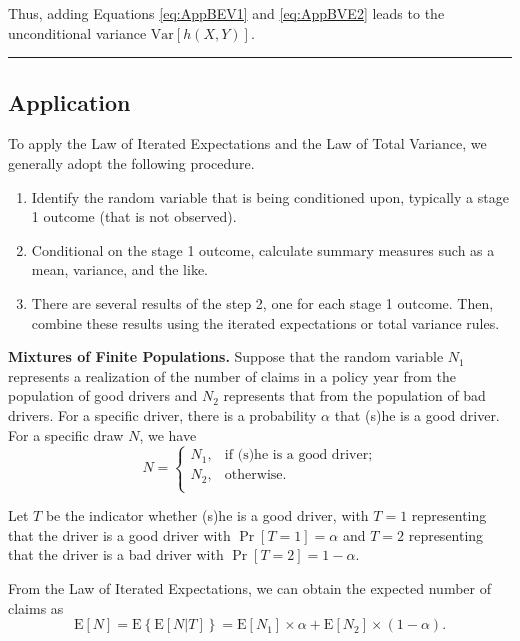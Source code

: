 \documentclass[]{book}
\theoremstyle{definition}
\theoremstyle{definition}
\theoremstyle{definition}
\theoremstyle{remark}
\begin{document}
Thus, adding Equations \eqref{eq:AppBEV1} and \eqref{eq:AppBVE2} leads to
the unconditional variance \(\mathrm{Var} \left[ h(X,Y) \right]\).

\begin{center}\rule{0.5\linewidth}{\linethickness}\end{center}

\subsection{Application}\label{application}

To apply the Law of Iterated Expectations and the Law of Total Variance,
we generally adopt the following procedure.

\begin{enumerate}
\def\labelenumi{\arabic{enumi}.}
\item
  Identify the random variable that is being conditioned upon, typically
  a stage 1 outcome (that is not observed).
\item
  Conditional on the stage 1 outcome, calculate summary measures such as
  a mean, variance, and the like.
\item
  There are several results of the step 2, one for each stage 1 outcome.
  Then, combine these results using the iterated expectations or total
  variance rules.
\end{enumerate}

\textbf{Mixtures of Finite Populations.} Suppose that the random
variable \(N_1\) represents a realization of the number of claims in a
policy year from the population of good drivers and \(N_2\) represents
that from the population of bad drivers. For a specific driver, there is
a probability \(\alpha\) that (s)he is a good driver. For a specific
draw \(N\), we have \[N =
    \begin{cases}
    N_1,  &  \text{if (s)he is a good driver;}\\
    N_2,  &   \text{otherwise}.\\
    \end{cases}\]

Let \(T\) be the indicator whether (s)he is a good driver, with \(T=1\)
representing that the driver is a good driver with \(\Pr[T=1]=\alpha\)
and \(T=2\) representing that the driver is a bad driver with
\(\Pr[T=2]=1-\alpha\).

From the Law of Iterated Expectations, we can obtain the expected number
of claims as \[
    \mathrm{E}[N]= \mathrm{E} \left\{ \mathrm{E} \left[ N | T \right] \right \}= \mathrm{E}[N_1] \times \alpha +  \mathrm{E}[N_2] \times (1-\alpha).\]
\end{document}
